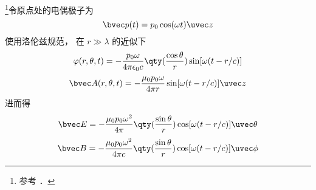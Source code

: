 
\begin{issues}
\issueDraft
\end{issues}


\footnote{参考 \cite{GriffE}．}令原点处的电偶极子为
\begin{equation}
\bvec p(t) = p_0 \cos(\omega t) \uvec z
\end{equation}
使用洛伦兹规范， 在 $r \gg \lambda$ 的近似下
\begin{equation}
\varphi(r, \theta, t) = -\frac{p_0\omega}{4\pi\epsilon_0 c} \qty(\frac{\cos\theta}{r}) \sin[\omega(t - r/c)]
\end{equation}
\begin{equation}
\bvec A(r, \theta, t) = -\frac{\mu_0 p_0 \omega}{4\pi r} \sin[\omega(t - r/c)]\uvec z
\end{equation}
进而得
\begin{equation}
\bvec E = -\frac{\mu_0 p_0\omega^2}{4\pi} \qty(\frac{\sin\theta}{r})\cos[\omega(t - r/c)]\uvec \theta
\end{equation}
\begin{equation}
\bvec B = -\frac{\mu_0 p_0\omega^2}{4\pi c} \qty(\frac{\sin\theta}{r})\cos[\omega(t - r/c)]\uvec \phi
\end{equation}
